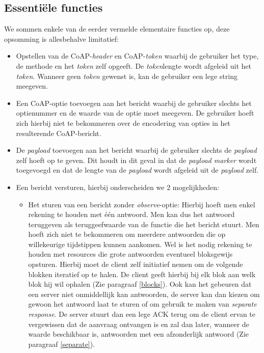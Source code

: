 \subsection{Essenti\"{e}le functies} \label{essentielefuncties}

We sommen enkele van de eerder vermelde elementaire functies op, deze opsomming is allesbehalve limitatief:

\begin{itemize}
\item Opstellen van de CoAP-\textit{header} en CoAP-\textit{token} waarbij de gebruiker het type, de methode en het \textit{token} zelf opgeeft. De \textit{token}lengte wordt afgeleid uit het \textit{token}. Wanneer geen \textit{token} gewenst is, kan de gebruiker een lege string meegeven.
\item Een CoAP-optie toevoegen aan het bericht waarbij de gebruiker slechts het optienummer en de waarde van de optie moet meegeven. De gebruiker hoeft zich hierbij niet te bekommeren over de encodering van opties in het resulterende CoAP-bericht.
\item De \textit{payload} toevoegen aan het bericht waarbij de gebruiker slechts de \textit{payload} zelf hoeft op te geven.  Dit houdt in dit geval in dat de \textit{payload marker} wordt toegevoegd en dat de lengte van de \textit{payload} wordt afgeleid uit de \textit{payload} zelf.
\item Een bericht versturen, hierbij onderscheiden we 2 mogelijkheden:
\begin{itemize}
\item Het sturen van een bericht zonder \textit{observe}-optie: Hierbij hoeft men enkel rekening te houden met \'{e}\'{e}n antwoord. Men kan dus het antwoord teruggeven als teruggeefwaarde van de functie die het bericht stuurt. Men hoeft zich niet te bekommeren om meerdere antwoorden die op willekeurige tijdstippen kunnen aankomen. Wel is het nodig rekening te houden met resources die grote antwoorden eventueel bloksgewijs opsturen. Hierbij moet de client zelf initiatief nemen om de volgende blokken iteratief op te halen. De client geeft hierbij bij elk blok aan welk blok hij wil ophalen (Zie paragraaf \ref{blocks}). Ook kan het gebeuren dat een server niet onmiddellijk kan antwoorden, de server kan dan kiezen om gewoon het antwoord laat te sturen of om gebruik te maken van \textit{separate response}. De server stuurt dan een lege ACK terug om de client ervan te vergewissen dat de aanvraag ontvangen is en zal dan later, wanneer de waarde beschikbaar is, antwoorden met een afzonderlijk antwoord (Zie paragraaf \ref{separate}).

\end{itemize}
\end{itemize}
